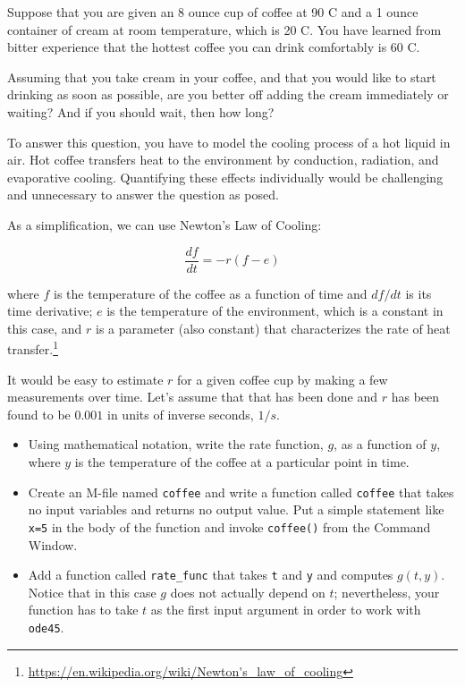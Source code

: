 \documentclass[
]{book}
\begin{document}
\begin{ex}
Suppose that you are given an 8 ounce cup of coffee at 90 \degree C and
a 1 ounce container of cream at room temperature, which is 20 \degree C.
You have learned from bitter experience that the hottest coffee you
can drink comfortably is 60 \degree C.

Assuming that you take cream in your coffee, and that you would like
to start drinking as soon as possible, are you better off adding
the cream immediately or waiting?  And if you should wait, then how
long?

To answer this question, you have to model the cooling process
of a hot liquid in air.  Hot coffee transfers heat to the environment
by conduction, radiation, and evaporative cooling.  Quantifying these
effects individually would be challenging and unnecessary to answer
the question as posed.

As a simplification, we can use Newton's Law of
Cooling:

\begin{equation}
\frac{df}{dt} = -r (f - e)
\end{equation}

%
where $f$ is the temperature of the coffee as a function of time and
$df/dt$ is its time derivative; $e$ is the temperature of the
environment, which is a constant in this case, and $r$ is a parameter
(also constant) that characterizes the rate of heat
transfer.\footnote{\url{https://en.wikipedia.org/wiki/Newton's_law_of_cooling}}

It would be easy to estimate $r$ for a given coffee cup by making
a few measurements over time.  Let's assume that that has been
done and $r$ has been found to be $0.001$ in units of inverse
seconds, $1/s$.

\begin{itemize}

\item Using mathematical notation, write the rate function, $g$,
as a function of $y$, where $y$ is the temperature of the
coffee at a particular point in time.

\item Create an M-file named {\tt coffee} and write a function
called {\tt coffee} that takes no input variables and returns no
output value.  Put a simple statement like {\tt x=5} in the body
of the function and invoke {\tt coffee()} from the Command Window.

\item Add a function called
{\tt rate\_func} that takes {\tt t} and {\tt y} and computes
$g(t,y)$.  Notice that in this case $g$ does not actually
depend on $t$; nevertheless, your function has to take $t$ as
the first input argument in order to work with {\tt ode45}.


\end{itemize}
\end{ex}
\end{document}
